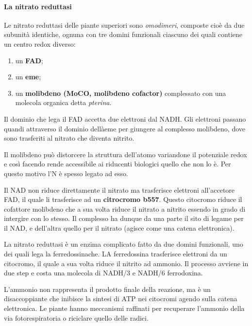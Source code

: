 \documentclass[]{article}
\begin{document}
\paragraph{La nitrato reduttasi}\label{la-nitrato-reduttasi}

Le nitrato reduttasi delle piante superiori sono \emph{omodimeri},
composte cioè da due subunità identiche, ognuna con tre domini
funzionali ciascuno dei quali contiene un centro redox diverso:

\begin{enumerate}
\def\labelenumi{\arabic{enumi}.}
\itemsep1pt\parskip0pt
\item
  un \textbf{FAD};
\item
  un \textbf{eme};
\item
  un \textbf{molibdeno (MoCO, molibdeno cofactor)} complessato con una
  molecola organica detta \emph{pterina}.
\end{enumerate}

Il dominio che lega il FAD accetta due elettroni dal NADH. Gli elettroni
passano quandi attraverso il dominio dellàeme per giungere al complesso
molibdeno, dove sono trasferiti al nitrato che diventa nitrito.

Il molibdeno può distorcere la struttura dell'atomo variandone il
potenziale redox e così facendo rende accessibile ai riducenti biologici
quello che non lo è. Per questo motivo l'N è spesso legato ad esso.

Il NAD non riduce direttamente il nitrato ma trasferisce elettroni
all'accetore FAD, il quale li trasferisce ad un \textbf{citrocromo
b557}. Questo citocromo riduce il cofattore molibdeno che a sua volta
riduce il nitrato a nitrito essendo in grado di intergire con lo stesso.
Il complesso ha dunque da una parte il sito di legame per il NAD, e
dell'altra quello per il nitrato (agisce come una catena elettronica).

La nitrato reduttasi è un enzima complicato fatto da due domini
funzionali, uno dei quali lega la ferredossinache. LA ferredossina
trasferisce elettroni da un citocromo, il quale a sua volta riduce il
nitrito ad ammonio. Il processo avviene in due step e costa una molecola
di NADH/3 e NADH/6 ferrodoxina.

L'ammonio non rappresenta il prodotto finale della reazione, ma è un
disaccoppiante che inibisce la sintesi di ATP nei citocromi agendo sulla
catena elettronica. Le piante hanno meccanismi raffinati per recuperare
l'ammonio della via fotorespiratoria o riciclare quello delle radici.
\end{document}
